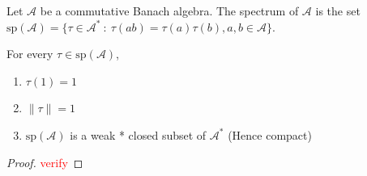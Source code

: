 \begin{definition}
  Let $\mathcal{A}$ be a commutative Banach algebra. The spectrum of
  $\mathcal{A}$ is the set $\textrm{sp}(\mathcal{A}) = \{ \tau \in
  \mathcal{A}^*  \ : \  \tau(ab) = \tau(a)\tau(b), a, b \in \mathcal{A} \}$.
\end{definition}

\begin{lemma}
  For every $\tau \in \textrm{sp}(\mathcal{A})$,
  \begin{enumerate}
    \item $\tau(1) = 1$
    \item $\|\tau\| = 1$
    \item $ \textrm{sp}(\mathcal{A})$ is a weak * closed subset of
      $\mathcal{A}^*$ (Hence compact)
  \end{enumerate}
\end{lemma}
\begin{proof}
  \textcolor{red}{verify}
\end{proof}
